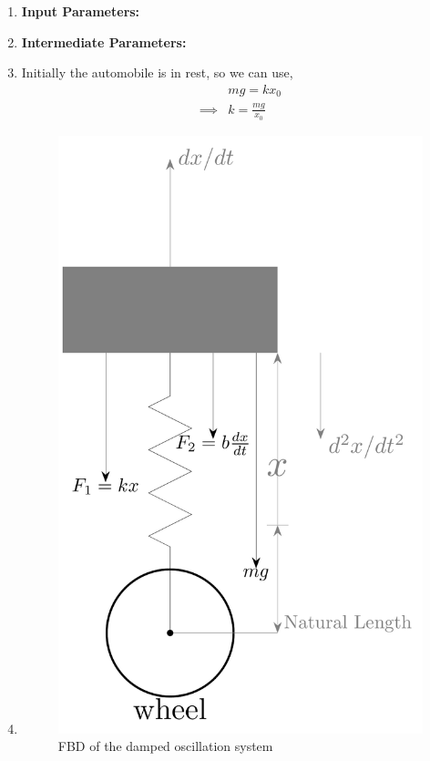\documentclass[journal,12pt,twocolumn]{IEEEtran}
\theoremstyle{remark}
\begin{document}
\begin{enumerate}
\item \textbf{Input Parameters:}
\begin{table}[h]
    
    \label{tab:Table-1}
\end{table}
\item \textbf{Intermediate Parameters:}
\begin{table}[h]

\label{tab:Table-2}
\end{table}

\item{}
    Initially the automobile is in rest, so we can use,
    \begin{align}
&mg = kx_0 \label{eq:1}\\
\implies &k=\frac{mg}{x_0} \label{eq:2}
    \end{align}

\item{}
\begin{figure}[h]
        \centering
        \includegraphics[width=0.8\columnwidth]{11_14_21_fbd.pdf}
        \caption{FBD of the damped oscillation system}
        \label{fig:Fig-1}
    \end{figure}


\end{enumerate}
\end{document}
